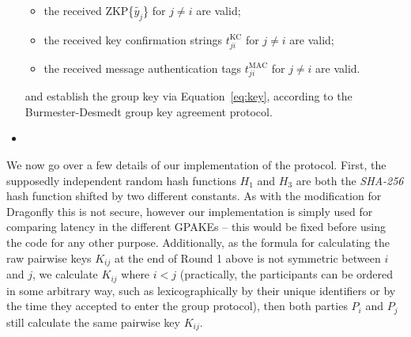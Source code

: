 \begin{itemize}
    \begin{itemize}
            \item the received ZKP\{$\tilde{y_j}$\} for $j \neq i$ are valid;
            \item the received key confirmation strings $t^{\text{KC}}_{ji}$ for $j \neq i$ are valid;
            \item the received message authentication tags $t^{\text{MAC}}_{ji}$ for $j \neq i$ are valid.
        \end{itemize}
        and establish the group key via Equation~\eqref{eq:key}, according to the Burmester-Desmedt group key agreement protocol.
        \item[]
\end{itemize}

We now go over a few details of our implementation of the
protocol. First, the supposedly independent random hash functions $H_1$ and $H_3$ are both the
 \textit{SHA-256} hash function shifted by two different constants. As with the modification for Dragonfly this is not
secure, however our implementation is simply used for comparing latency in the different GPAKEs -- this would be fixed 
before using the code for any other purpose.  Additionally,
as the formula for calculating the raw pairwise keys $K_{ij}$ at the end of
Round 1 above is not symmetric between $i$ and $j$, we calculate $K_{ij}$ where $i < j$ (practically, the 
participants can be ordered in some arbitrary way, such as lexicographically by their unique identifiers 
or by the time they accepted to enter the group protocol), then both parties $P_i$ and $P_j$ still calculate the same pairwise key $K_{ij}$.


